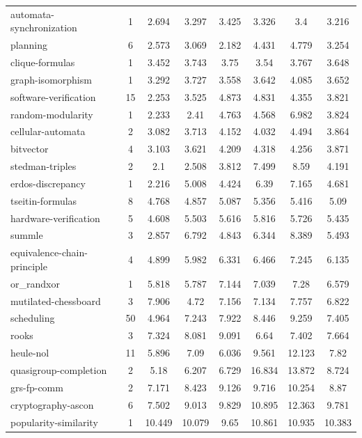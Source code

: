 \documentclass[12pt,a4paper,twoside]{scrartcl}
\numberwithin{equation}{section}
\begin{document}
\begin{longtable}{ l|c|c|c|c|c|c|c }
    automata-synchronization	&	1	&	2.694	&	3.297	&	3.425	&	3.326	&	3.4	&	3.216\\
    planning	&	6	&	2.573	&	3.069	&	2.182	&	4.431	&	4.779	&	3.254\\
    clique-formulas	&	1	&	3.452	&	3.743	&	3.75	&	3.54	&	3.767	&	3.648\\
    graph-isomorphism	&	1	&	3.292	&	3.727	&	3.558	&	3.642	&	4.085	&	3.652\\
    software-verification	&	15	&	2.253	&	3.525	&	4.873	&	4.831	&	4.355	&	3.821\\
    random-modularity	&	1	&	2.233	&	2.41	&	4.763	&	4.568	&	6.982	&	3.824\\
    cellular-automata	&	2	&	3.082	&	3.713	&	4.152	&	4.032	&	4.494	&	3.864\\
    bitvector	&	4	&	3.103	&	3.621	&	4.209	&	4.318	&	4.256	&	3.871\\
    stedman-triples	&	2	&	2.1	&	2.508	&	3.812	&	7.499	&	8.59	&	4.191\\
    erdos-discrepancy	&	1	&	2.216	&	5.008	&	4.424	&	6.39	&	7.165	&	4.681\\
    tseitin-formulas	&	8	&	4.768	&	4.857	&	5.087	&	5.356	&	5.416	&	5.09\\
    hardware-verification	&	5	&	4.608	&	5.503	&	5.616	&	5.816	&	5.726	&	5.435\\
    summle	&	3	&	2.857	&	6.792	&	4.843	&	6.344	&	8.389	&	5.493\\
    equivalence-chain-principle	&	4	&	4.899	&	5.982	&	6.331	&	6.466	&	7.245	&	6.135\\
    or\_randxor	&	1	&	5.818	&	5.787	&	7.144	&	7.039	&	7.28	&	6.579\\
    mutilated-chessboard	&	3	&	7.906	&	4.72	&	7.156	&	7.134	&	7.757	&	6.822\\
    scheduling	&	50	&	4.964	&	7.243	&	7.922	&	8.446	&	9.259	&	7.405\\
    rooks	&	3	&	7.324	&	8.081	&	9.091	&	6.64	&	7.402	&	7.664\\
    heule-nol	&	11	&	5.896	&	7.09	&	6.036	&	9.561	&	12.123	&	7.82\\
    quasigroup-completion	&	2	&	5.18	&	6.207	&	6.729	&	16.834	&	13.872	&	8.724\\
    grs-fp-comm	&	2	&	7.171	&	8.423	&	9.126	&	9.716	&	10.254	&	8.87\\
    cryptography-ascon	&	6	&	7.502	&	9.013	&	9.829	&	10.895	&	12.363	&	9.781\\
    popularity-similarity	&	1	&	10.449	&	10.079	&	9.65	&	10.861	&	10.935	&	10.383\\

\end{longtable}
\end{document}
